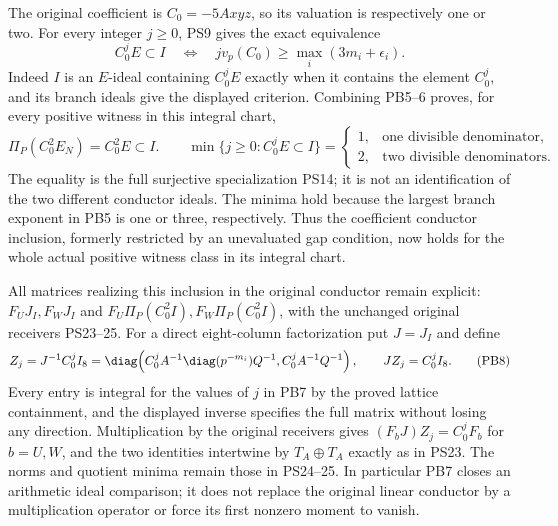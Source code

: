 The original coefficient is $C_0=-5Axyz$, so its valuation is respectively
one or two. For every integer $j\ge0$, PS9 gives the exact equivalence
\[
 C_0^jE\subset I\quad\Longleftrightarrow\quad
 jv_p(C_0)\ge\max_i(3m_i+\epsilon_i).
 \tag{PB6}
\]
Indeed $I$ is an $E$-ideal containing $C_0^jE$ exactly when it contains
the element $C_0^j$, and its branch ideals give the displayed criterion.
Combining PB5--6 proves, for every positive witness in this integral chart,
\[
 \boxed{\Pi_P(C_0^2E_N)=C_0^2E\subset I.}\qquad
 \min\{j\ge0:C_0^jE\subset I\}=
 \begin{cases}1,&\text{one divisible denominator},\\
 2,&\text{two divisible denominators}.
 \end{cases}\tag{PB7}
\]
The equality is the full surjective specialization PS14; it is not an
identification of the two different conductor ideals. The minima hold
because the largest branch exponent in PB5 is one or three, respectively.
Thus the coefficient conductor inclusion, formerly restricted by an
unevaluated gap condition, now holds for the whole actual positive
witness class in its integral chart.

All matrices realizing this inclusion in the original conductor remain
explicit: $F_UJ_I,F_WJ_I$ and $F_U\Pi_P(C_0^2I),F_W\Pi_P(C_0^2I)$,
with the unchanged original receivers PS23--25. For a direct eight-column
factorization put $J=J_I$ and define
\[
 Z_j=J^{-1}C_0^jI_8
 =\diag\!\left(C_0^j A^{-1}\diag(p^{-m_i})Q^{-1},
                   C_0^j A^{-1}Q^{-1}\right),\qquad
 JZ_j=C_0^jI_8.
 \tag{PB8}
\]
Every entry is integral for the values of $j$ in PB7 by the proved
lattice containment, and the displayed inverse specifies the full
matrix without losing any direction. Multiplication by the original
receivers gives $(F_bJ)Z_j=C_0^jF_b$ for $b=U,W$, and the two
identities intertwine by $T_A\oplus T_A$ exactly as in PS23.
The norms and quotient minima remain those in PS24--25. In particular
PB7 closes an arithmetic ideal comparison; it does not replace the
original linear conductor by a multiplication operator or force its
first nonzero moment to vanish.
